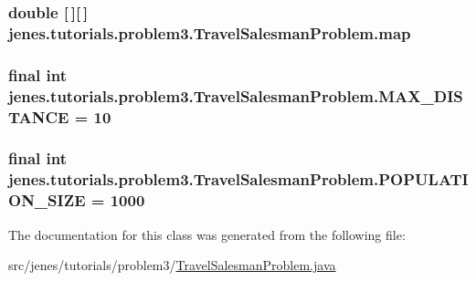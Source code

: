 \hypertarget{classjenes_1_1tutorials_1_1problem3_1_1_travel_salesman_problem_a44794d38e04e405daa3b78f1c838a167}{
\subsubsection[{map}]{\setlength{\rightskip}{0pt plus 5cm}double \mbox{[}$\,$\mbox{]}\mbox{[}$\,$\mbox{]} jenes.\-tutorials.\-problem3.\-Travel\-Salesman\-Problem.\-map\hspace{0.3cm}{\ttfamily [private]}}}\label{classjenes_1_1tutorials_1_1problem3_1_1_travel_salesman_problem_a44794d38e04e405daa3b78f1c838a167}
\hypertarget{classjenes_1_1tutorials_1_1problem3_1_1_travel_salesman_problem_a94747a5d97d1f3974d74a27e641285c8}{
\subsubsection[{M\-A\-X\-\_\-\-D\-I\-S\-T\-A\-N\-C\-E}]{\setlength{\rightskip}{0pt plus 5cm}final int jenes.\-tutorials.\-problem3.\-Travel\-Salesman\-Problem.\-M\-A\-X\-\_\-\-D\-I\-S\-T\-A\-N\-C\-E = 10\hspace{0.3cm}{\ttfamily [static]}}}\label{classjenes_1_1tutorials_1_1problem3_1_1_travel_salesman_problem_a94747a5d97d1f3974d74a27e641285c8}
\hypertarget{classjenes_1_1tutorials_1_1problem3_1_1_travel_salesman_problem_afda171e13788bcb67f73fd82bd89498b}{
\subsubsection[{P\-O\-P\-U\-L\-A\-T\-I\-O\-N\-\_\-\-S\-I\-Z\-E}]{\setlength{\rightskip}{0pt plus 5cm}final int jenes.\-tutorials.\-problem3.\-Travel\-Salesman\-Problem.\-P\-O\-P\-U\-L\-A\-T\-I\-O\-N\-\_\-\-S\-I\-Z\-E = 1000\hspace{0.3cm}{\ttfamily [static]}}}\label{classjenes_1_1tutorials_1_1problem3_1_1_travel_salesman_problem_afda171e13788bcb67f73fd82bd89498b}


The documentation for this class was generated from the following file\-:\begin{DoxyCompactItemize}
\item 
src/jenes/tutorials/problem3/\hyperlink{tutorials_2problem3_2_travel_salesman_problem_8java}{Travel\-Salesman\-Problem.\-java}\end{DoxyCompactItemize}
